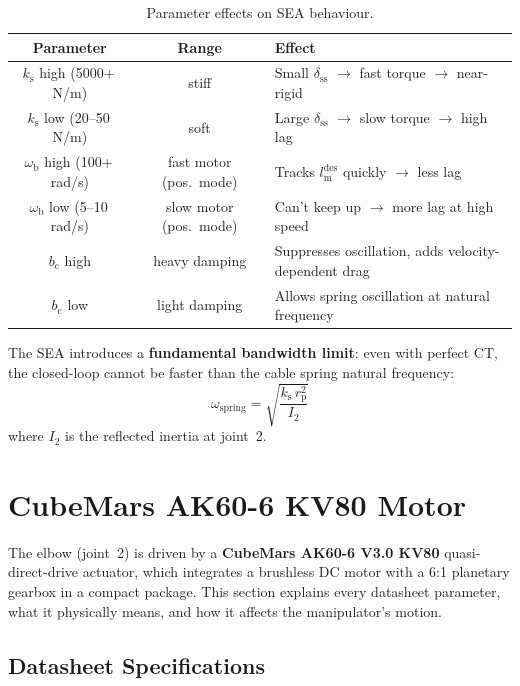 \documentclass[11pt,a4paper]{article}
\newcommand{\rp}{r_{\mathrm{p}}}
\newcommand{\lm}{l_{\mathrm{m}}}
\newcommand{\ks}{k_{\mathrm{s}}}
\newcommand{\bc}{b_{\mathrm{c}}}
\newcommand{\wb}{\omega_{\mathrm{b}}}
\begin{document}
\begin{table}[H]
\centering
\caption{Parameter effects on SEA behaviour.}
\begin{tabular}{ccl}
\toprule
\textbf{Parameter} & \textbf{Range} & \textbf{Effect} \\
\midrule
$\ks$ high (5000+\,N/m) & stiff & Small $\delta_{\mathrm{ss}}$ $\to$ fast torque $\to$ near-rigid \\
$\ks$ low (20--50\,N/m)  & soft  & Large $\delta_{\mathrm{ss}}$ $\to$ slow torque $\to$ high lag \\
$\wb$ high (100+\,rad/s)  & fast motor (pos.\ mode) & Tracks $\lm^{\mathrm{des}}$ quickly $\to$ less lag \\
$\wb$ low (5--10\,rad/s)  & slow motor (pos.\ mode) & Can't keep up $\to$ more lag at high speed \\
$\bc$ high & heavy damping & Suppresses oscillation, adds velocity-dependent drag \\
$\bc$ low  & light damping & Allows spring oscillation at natural frequency \\
\bottomrule
\end{tabular}
\end{table}

The SEA introduces a \textbf{fundamental bandwidth limit}: even with perfect CT, the closed-loop cannot be faster than the cable spring natural frequency:
\begin{equation}
    \omega_{\mathrm{spring}} = \sqrt{\frac{\ks \, \rp^2}{I_2}}
\end{equation}
where $I_2$ is the reflected inertia at joint~2.


\section{CubeMars AK60-6 KV80 Motor}
\label{sec:cubemars}

The elbow (joint~2) is driven by a \textbf{CubeMars AK60-6 V3.0 KV80} quasi-direct-drive actuator, which integrates a brushless DC motor with a 6:1 planetary gearbox in a compact package.  This section explains every datasheet parameter, what it physically means, and how it affects the manipulator's motion.

\subsection{Datasheet Specifications}
\end{document}
